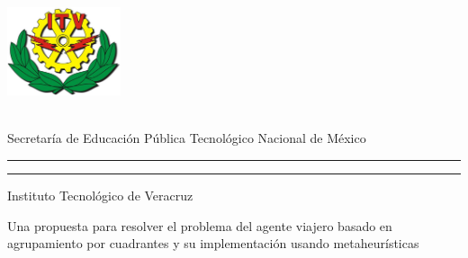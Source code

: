 \begin{titlepage}
\thispagestyle{empty}

\newcommand{\titulo}[1]{\def\eltitulo{#1}}
\newcommand{\carrera}[1]{\def\lacarrera{#1}}
\newcommand{\nombre}[1]{\def\elnombre{#1}}    %
\newcommand{\director}[1]{\def\eldirector{#1}}  %
\newcommand{\fecha}[1]{\def\lafecha{#1}}

\titulo{Una propuesta para resolver el problema del agente viajero basado en agrupamiento por cuadrantes y  su implementación usando metaheurísticas}
\nombre{{Guillermo Sebastián Medina Palacios}}
\carrera{Ingeniero en Sistemas Computacionales}
\director{{M.C. Rafael Rivera López}\\{Dr. Marco Antonio Cruz Chávez}}
\fecha{2017}

\begin{minipage}[c][10cm][s]{3cm} 
  \begin{center}
  
   \includegraphics[height=2.6cm]{Imagenes/LogoITV.jpg}\\[10pt]

    \hskip2pt
    \vrule width2pt height17cm \hskip1mm
    \vrule width1pt height17cm    
    \\[10pt]
    
  \end{center}
\end{minipage}\quad
\begin{minipage}[c][9.5cm][s]{10cm}
  \begin{center}
    {\Large Secretaría de Educación Pública}
	{\Large Tecnológico Nacional de México}
    \vspace{.3cm}
    \hrule height 2pt
    \vspace{.1cm}
    \hrule height 1pt
    \vspace{.3cm}
    {\large Instituto Tecnológico de Veracruz}

    \vspace{3cm}

    {\Large \eltitulo}


\end{center}
\end{minipage}
\end{titlepage}
